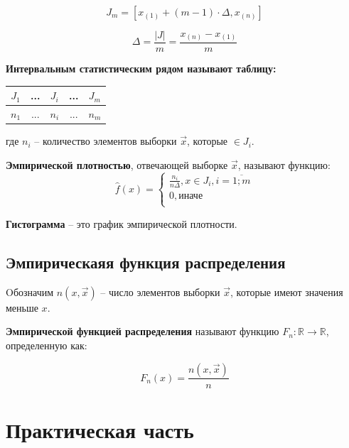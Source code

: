 \documentclass[12pt]{report}
\begin{document}
\begin{equation}
    J_{m} = [x_{(1)} + (m - 1) \cdot \Delta, x_{(n)}]
\end{equation}

\begin{equation}
    \Delta = \frac{|J|}{m} = \frac{x_{(n)} - x_{(1)}}{m}
\end{equation}

\textbf{Интервальным статистическим рядом называют таблицу:}

\begin{table}[htb]
    \centering
    \begin{tabular}{|c|c|c|c|c|}
        \hline
        $J_1$ & ... & $J_i$ & ... & $J_m$ \\
        \hline
        $n_1$ & ... & $n_i$ & ... & $n_m$ \\
        \hline
    \end{tabular}
\end{table}

где $n_i$ -- количество элементов выборки $\vec x$, которые $\in J_i$.

\textbf{Эмпирической плотностью}, отвечающей выборке $\vec x$, называют функцию:
\begin{equation}
    \hat f(x) =
    \begin{cases}
        \frac{n_i}{n \Delta}, x \in J_i, i = \overline{1; m} \\
        0, \text{иначе} \\
    \end{cases}
\end{equation}

\textbf{Гистограмма} -- это график эмпирической плотности.

\section{Эмпирическаяя функция распределения}

Oбозначим $n(x, \vec x)$ -- число элементов выборки $\vec x$, которые имеют значения меньше $x$.

\textbf{Эмпирической функцией распределения} называют функцию $F_n: \mathbb{R} \to \mathbb{R}$, определенную как: 

\begin{equation}
    F_n(x) = \frac{n(x, \vec x)}{n}
\end{equation}

\chapter{Практическая часть}
\end{document}
